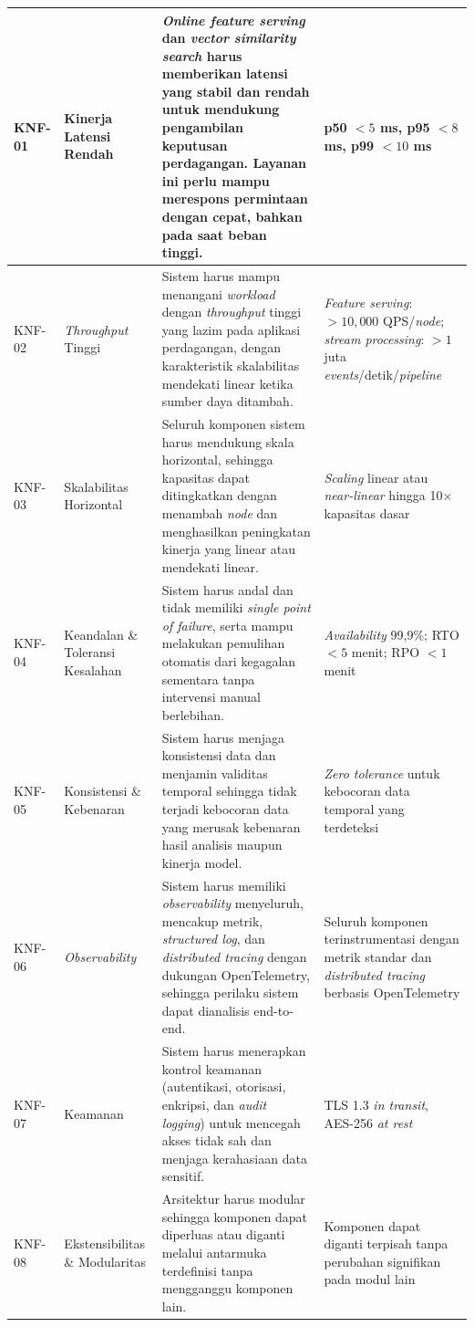 {\begin{longtable}{|>{\centering\arraybackslash}m{1cm}|m{2.5cm}|m{6cm}|m{3cm}|}
KNF-01 & Kinerja Latensi Rendah & \textit{Online feature serving} dan \textit{vector similarity search} harus memberikan latensi yang stabil dan rendah untuk mendukung pengambilan keputusan perdagangan. Layanan ini perlu mampu merespons permintaan dengan cepat, bahkan pada saat beban tinggi. & p50 $< 5$ ms, p95 $< 8$ ms, p99 $< 10$ ms \\
\hline
KNF-02 & \textit{Throughput} Tinggi & Sistem harus mampu menangani \textit{workload} dengan \textit{throughput} tinggi yang lazim pada aplikasi perdagangan, dengan karakteristik skalabilitas mendekati linear ketika sumber daya ditambah. & \textit{Feature serving}: $> 10{,}000$ QPS/\textit{node}; \textit{stream processing}: $> 1$ juta \textit{events}/detik/\textit{pipeline} \\
\hline
KNF-03 & Skalabilitas Horizontal & Seluruh komponen sistem harus mendukung skala horizontal, sehingga kapasitas dapat ditingkatkan dengan menambah \textit{node} dan menghasilkan peningkatan kinerja yang linear atau mendekati linear. & \textit{Scaling} linear atau \textit{near-linear} hingga 10$\times$ kapasitas dasar \\
\hline
KNF-04 & Keandalan \& Toleransi Kesalahan & Sistem harus andal dan tidak memiliki \textit{single point of failure}, serta mampu melakukan pemulihan otomatis dari kegagalan sementara tanpa intervensi manual berlebihan. & \textit{Availability} 99{,}9\%; RTO $< 5$ menit; RPO $< 1$ menit \\
\hline
KNF-05 & Konsistensi \& Kebenaran & Sistem harus menjaga konsistensi data dan menjamin validitas temporal sehingga tidak terjadi kebocoran data yang merusak kebenaran hasil analisis maupun kinerja model. & \textit{Zero tolerance} untuk kebocoran data temporal yang terdeteksi \\
\hline
KNF-06 & \textit{Observability} & Sistem harus memiliki \textit{observability} menyeluruh, mencakup metrik, \textit{structured log}, dan \textit{distributed tracing} dengan dukungan OpenTelemetry, sehingga perilaku sistem dapat dianalisis end-to-end. & Seluruh komponen terinstrumentasi dengan metrik standar dan \textit{distributed tracing} berbasis OpenTelemetry \\
\hline
KNF-07 & Keamanan & Sistem harus menerapkan kontrol keamanan (autentikasi, otorisasi, enkripsi, dan \textit{audit logging}) untuk mencegah akses tidak sah dan menjaga kerahasiaan data sensitif. & TLS 1.3 \textit{in transit}, AES-256 \textit{at rest} \\
\hline
KNF-08 & Ekstensibilitas \& Modularitas & Arsitektur harus modular sehingga komponen dapat diperluas atau diganti melalui antarmuka terdefinisi tanpa mengganggu komponen lain. & Komponen dapat diganti terpisah tanpa perubahan signifikan pada modul lain \\

\end{longtable}}
